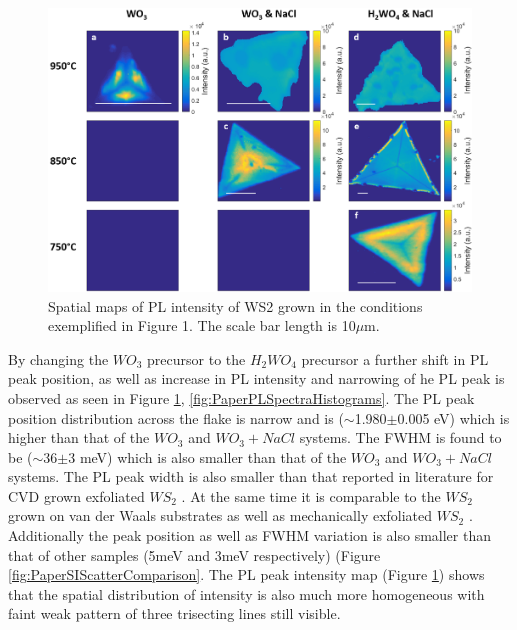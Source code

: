 \begin{figure}[h]
\begin{center}
\includegraphics[scale=0.3]{PaperPLMaps.png}
\caption{Spatial maps of PL intensity of WS2 grown in the conditions exemplified in Figure 1. The scale bar length is 10$\mu$m.}
\label{fig:PaperPLMaps}
\end{center}
\end{figure}

By changing the $WO_3$ precursor to the $H_2WO_4$ precursor a further shift in PL peak position, as well as increase in PL intensity and narrowing of he PL peak is observed as seen in Figure \ref{fig:PaperPLMaps}, \ref{fig:PaperPLSpectraHistograms}. The PL peak position distribution across the flake is narrow and is ({$\sim$}1.980{$\pm$}0.005 eV) which is higher than that of the $WO_3$ and $WO_3 + NaCl$ systems. The FWHM is found to be ({$\sim$}36{$\pm$}3 meV) which is also smaller than that of the $WO_3$ and $WO_3 + NaCl$ systems. The PL peak width is also smaller than that reported in literature for CVD grown \cite{ExtraordinaryRoomTemperaturePhotoluminescenceInTriangularWS2Monolayers}\cite{Rong2014}\cite{Hu2016}\cite{Kang2015a} exfoliated $WS_2$ \cite{EvolutionOfElectronicStructureInAtomicallyThinSheetsOfWS2AndWSe2}\cite{doi:10.1021/nn5059908}. At the same time it is comparable to the $WS_2$ grown on van der Waals substrates \cite{doi:10.1021/nn503093k} as well as mechanically exfoliated $WS_2$ \cite{doi:10.1021/nl500171v}. Additionally the peak position as well as FWHM variation is also smaller than that of other samples (5meV and 3meV respectively) (Figure \ref{fig:PaperSIScatterComparison}. The PL peak intensity map (Figure \ref{fig:PaperPLMaps}) shows that the spatial distribution of intensity is also much more homogeneous with faint weak pattern of three trisecting lines still visible.

